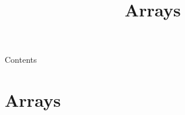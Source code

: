 
\usepackage{tikz}
\usepackage{hyperref}
\newcommand{\topic}{
	Arrays
}
\title{\topic}
\supertitle{\course}
\date{}



\maketitle

\begin{frame}{Contents}
	\tableofcontents
\end{frame}

\section{Arrays}

